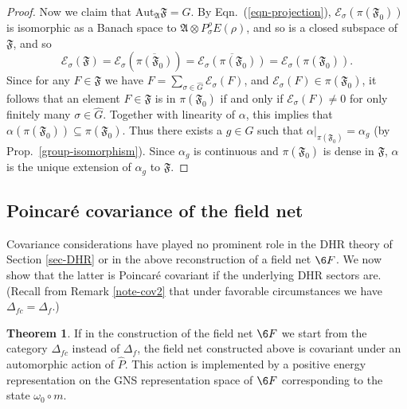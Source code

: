 \documentclass[12pt]{article}
\newcommand{\alg}[1]{\mathfrak{#1}}
\theoremstyle{definition}
\newtheorem{thm}{Theorem}[section]
\theoremstyle{definition}
\theoremstyle{remark}
\def\4#1{{\mathscr #1}}
\def\a{\alpha} \def\b{\beta} \def\g{\gamma} \def\d{\delta}
\newcommand{\Aut}{\mathrm{Aut}}
\begin{document}
\begin{proof}
Now we claim that $\Aut _{\alg{A}}\alg{F}=G$.  By Eqn.\
(\ref{eqn-projection}), $\4E _\sigma (\pi (\alg{F}_0))$
is isomorphic as a Banach space to $\alg{A}\otimes
P_{\sigma}^{\rho}E(\rho )$, and so is a closed subspace
of $\alg{F}$, and so
$$ \4E _\sigma (\alg{F})=\4E _\sigma (\overline{\pi (\alg{F}_0)})=\overline{\4E
  _{\sigma}(\pi (\alg{F}_0))}= \4E _\sigma (\pi (\alg{F}_0)) .$$ Since for any $F\in
\alg{F}$ we have $F=\sum _{\sigma \in \hat{G}}\4E _\sigma (F)$, and $\4E _\sigma
(F)\in \pi (\alg{F}_0)$, it follows that an element $F\in \alg{F}$ is in $\pi
(\alg{F}_0)$ if and only if $\4E _{\sigma}(F)\neq 0$ for only finitely many $\sigma
\in \hat{G}$.  Together with linearity of $\a$, this implies that $\a (\pi
(\alg{F}_0))\subseteq \pi (\alg{F}_0)$.  Thus there exists a $g\in G$ such that $\a
|_{\pi (\alg{F}_0)}=\a _g$ (by Prop.\ \ref{group-isomorphism}).  Since $\a _g$ is
continuous and $\pi (\alg{F}_0)$ is dense in $\alg{F}$, $\a$ is the unique extension
of $\a _g$ to $\alg{F}$.
\end{proof}


\subsection{Poincar\'e covariance of the field net}
Covariance considerations have played no prominent role
in the DHR theory of Section \ref{sec-DHR} or in the
above reconstruction of a field net $\6F$. We now show
that the latter is Poincar\'e covariant if the
underlying DHR sectors are. (Recall from Remark
\ref{note-cov2} that under favorable circumstances we
have $\Delta_{fc}=\Delta_f$.)

\begin{thm} If in the construction of the field net $\6F$ we start from the category $\Delta_{fc}$
instead of $\Delta_f$, the field net constructed above is covariant under an automorphic action of
$\widehat{P}$. This action is implemented by a positive energy representation on the GNS
representation space of $\6F$ corresponding to the state $\omega_0\circ m$.  
\end{thm}
\end{document}
